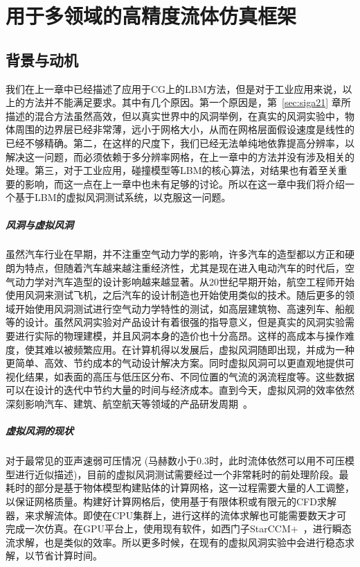 \chapter{用于多领域的高精度流体仿真框架}
\label{sec:sig23}

\section{背景与动机}
我们在上一章中已经描述了应用于CG上的LBM方法，但是对于工业应用来说，以上的方法并不能满足要求。其中有几个原因。第一个原因是，第~\ref{sec:siga21} 章所描述的混合方法虽然高效，但以真实世界中的风洞举例，在真实的风洞实验中，物体周围的边界层已经非常薄，远小于网格大小，从而在网格层面假设速度是线性的已经不够精确。第二，在这样的尺度下，我们已经无法单纯地依靠提高分辨率，以解决这一问题，而必须依赖于多分辨率网格，在上一章中的方法并没有涉及相关的处理。第三，对于工业应用，碰撞模型等LBM的核心算法，对结果也有着至关重要的影响，而这一点在上一章中也未有足够的讨论。所以在这一章中我们将介绍一个基于LBM的虚拟风洞测试系统，以克服这一问题。

\paragraph{风洞与虚拟风洞}
虽然汽车行业在早期，并不注重空气动力学的影响，许多汽车的造型都以方正和硬朗为特点，但随着汽车越来越注重经济性，尤其是现在进入电动汽车的时代后，空气动力学对汽车造型的设计影响越来越显著。从20世纪早期开始，航空工程师开始使用风洞来测试飞机，之后汽车的设计制造也开始使用类似的技术。随后更多的领域开始使用风洞测试进行空气动力学特性的测试，如高层建筑物、高速列车、船舰等的设计。虽然风洞实验对产品设计有着很强的指导意义，但是真实的风洞实验需要进行实际的物理建模，并且风洞本身的造价也十分高昂。这样的高成本与操作难度，使其难以被频繁应用。在计算机得以发展后，虚拟风洞随即出现，并成为一种更简单、高效、节约成本的气动设计解决方案。同时虚拟风洞可以更直观地提供可视化结果，如表面的高压与低压区分布、不同位置的气流的涡流程度等。这些数据可以在设计的迭代中节约大量的时间与经济成本。直到今天，虚拟风洞的效率依然深刻影响汽车、建筑、航空航天等领域的产品研发周期~\cite{HighriseBuildings,windScience}。

\paragraph{虚拟风洞的现状}
对于最常见的亚声速弱可压情况 (马赫数小于0.3时，此时流体依然可以用不可压模型进行近似描述)，目前的虚拟风洞测试需要经过一个非常耗时的前处理阶段。最耗时的部分是基于物体模型构建贴体的计算网格，这一过程需要大量的人工调整，以保证网格质量。构建好计算网格后，使用基于有限体积或有限元的CFD求解器，来求解流体。即使在CPU集群上，进行这样的流体求解也可能需要数天才可完成一次仿真。在GPU平台上，使用现有软件，如西门子StarCCM+~\cite{Siemens}，进行瞬态流求解，也是类似的效率。所以更多时候，在现有的虚拟风洞实验中会进行稳态求解，以节省计算时间。

